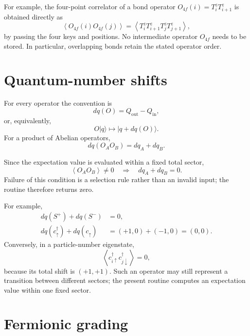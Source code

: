 \documentclass[11pt,a4paper]{article}
\newcommand{\ket}[1]{\lvert #1\rangle}
\newcommand{\avg}[1]{\left\langle #1\right\rangle}
\begin{document}
For example, the four-point correlator of a bond operator
$O_{4f}(i)=T^z_iT^z_{i+1}$ is obtained directly as
\begin{equation}
  \avg{O_{4f}(i)O_{4f}(j)}
  =\avg{T^z_iT^z_{i+1}T^z_jT^z_{j+1}},
\end{equation}
by passing the four keys and positions.  No intermediate operator
$O_{4f}$ needs to be stored.  In particular, overlapping bonds retain
the stated operator order.

\section{Quantum-number shifts}

For every operator the convention is
\begin{equation}
  dq(O)=Q_{\mathrm{out}}-Q_{\mathrm{in}},
\end{equation}
or, equivalently,
\begin{equation}
  O\ket{q}\longmapsto\ket{q+dq(O)}.
\end{equation}
For a product of Abelian operators,
\begin{equation}
  dq(O_AO_B)=dq_A+dq_B.
\end{equation}

Since the expectation value is evaluated within a fixed total sector,
\begin{equation}
  \avg{O_AO_B}\ne 0
  \quad\Longrightarrow\quad
  dq_A+dq_B=0.
\end{equation}
Failure of this condition is a selection rule rather than an invalid input;
the routine therefore returns zero.

For example,
\begin{align}
  dq(S^+)+dq(S^-)&=0,\\
  dq(c^\dagger_{\uparrow})+dq(c_{\uparrow})
    &=(+1,0)+(-1,0)=(0,0).
\end{align}
Conversely, in a particle-number eigenstate,
\begin{equation}
  \avg{c^\dagger_{i\uparrow}c^\dagger_{j\downarrow}}=0,
\end{equation}
because its total shift is $(+1,+1)$.  Such an operator may still represent a
transition between different sectors; the present routine computes an
expectation value within one fixed sector.

\section{Fermionic grading}
\end{document}

